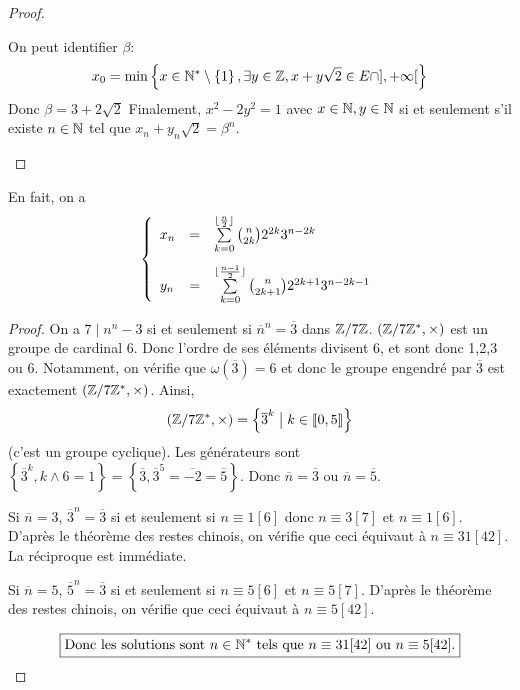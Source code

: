 \documentclass[12pt]{article}
\begin{document}
\begin{proof}
\begin{enumerate}
		On peut identifier $\beta$:
		\begin{equation}
			x_{0}=\min\left\{x\in\mathbb{N}^{*}\setminus\left\{1\right\},\exists y\in\mathbb{Z},x+y\sqrt{2}\in E\cap],+\infty[\right\}
		\end{equation}
		Donc $\beta=3+2\sqrt{2}$ Finalement, $x^{2}-2y^{2}=1$ avec $x\in\mathbb{N},y\in\mathbb{N}$ si et seulement s'il existe $n\in\mathbb{N}$ tel que $x_{n}+y_{n}\sqrt{2}=\beta^{n}$.
	\end{enumerate}
\end{proof}

\begin{remark}
	En fait, on a 
	\begin{equation}
		\left\{
			\begin{array}[]{lcl}
				x_{n} &= &\sum\limits_{k=0}^{\lfloor \frac{n}{2}\rfloor}\binom{n}{2k}2^{2k}3^{n-2k}\\[0.5cm]
				y_{n} &= &\sum\limits_{k=0}^{\lfloor \frac{n-1}{2}\rfloor}\binom{n}{2k+1}2^{2k+1}3^{n-2k-1}
			\end{array}	
		\right.
	\end{equation}
\end{remark}

\begin{proof}
	On a $7\mid n^{n}-3$ si et seulement si $\overline{n}^{n}=\overline{3}$ dans $\mathbb{Z}/7\mathbb{Z}$. $(\mathbb{Z}/7\mathbb{Z}^{*},\times)$ est un groupe de cardinal 6. Donc l'ordre de ses éléments divisent 6, et sont donc 1,2,3 ou 6. Notamment, on vérifie que $\omega(\overline{3})=6$ et donc le groupe engendré par $\overline{3}$ est exactement $(\mathbb{Z}/7\mathbb{Z}^{*},\times)$. Ainsi, 
	\begin{equation}
		(\mathbb{Z}/7\mathbb{Z}^{*},\times)=\left\{\overline{3}^{k}\bigm| k\in\left\llbracket 0,5\right\rrbracket\right\}
	\end{equation}
	(c'est un groupe cyclique). Les générateurs sont $\left\{\overline{3}^{k},k\wedge 6=1\right\}=\left\{\overline{3},\overline{3}^{5}=\overline{-2}=\overline{5}\right\}$.
	Donc $\overline{n}=\overline{3}$ ou $\overline{n}=\overline{5}$.

	Si $\overline{n}=3$, $\overline{3}^{n}=\overline{3}$ si et seulement si $n\equiv1[6]$ donc $n\equiv 3[7]$ et $n\equiv1[6]$. D'après le théorème des restes chinois, on vérifie que ceci équivaut à $n\equiv31[42]$. La réciproque est immédiate.

	Si $\overline{n}=5$, $\overline{5}^{n}=\overline{3}$ si et seulement si $n\equiv5[6]$ et $n\equiv5[7]$. D'après le théorème des restes chinois, on vérifie que ceci équivaut à $n\equiv5[42]$.

	\begin{equation}
		\boxed{\text{Donc les solutions sont }n\in\mathbb{N}^{*}\text{ tels que }n\equiv31[42]\text{ ou }n\equiv5[42].}
	\end{equation}
\end{proof}
\end{document}
